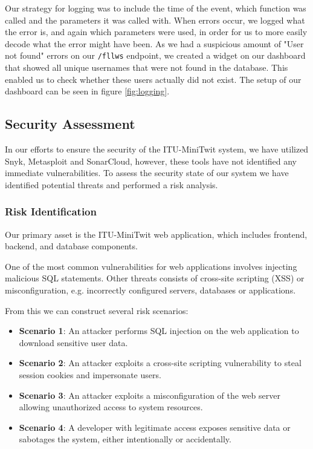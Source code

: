 Our strategy for logging was to include the time of the event, which function was called and the parameters it was called with. 
When errors occur, we logged what the error is, and again which parameters were used, in order for us to more easily decode what the error might have been.
As we had a suspicious amount of "User not found" errors on our \texttt{/fllws} endpoint, we created a widget on our dashboard that showed all unique usernames that were not found in the database. This enabled us to check whether these users actually did not exist.
The setup of our dashboard can be seen in figure \ref{fig:logging}.


\subsection{Security Assessment}
In our efforts to ensure the security of the ITU-MiniTwit system, we have utilized Snyk, Metasploit and SonarCloud, however, these tools have not identified any immediate vulnerabilities. To assess the security state of our system we have identified potential threats and performed a risk analysis.

\subsubsection*{Risk Identification}
Our primary asset is the ITU-MiniTwit web application, which includes frontend, backend, and database components.

One of the most common vulnerabilities for web applications involves injecting malicious SQL statements. Other threats consists of cross-site scripting (XSS) or misconfiguration, e.g. incorrectly configured servers, databases or applications.

From this we can construct several risk scenarios:

\begin{multicols}{2}
    \begin{itemize}
        \item \textbf{Scenario 1}: An attacker performs SQL injection on the web application to download sensitive user data.
        \item \textbf{Scenario 2}: An attacker exploits a cross-site scripting vulnerability to steal session cookies and impersonate users.
        \item \textbf{Scenario 3}: An attacker exploits a misconfiguration of the web server allowing unauthorized access to system resources.
        \item \textbf{Scenario 4}: A developer with legitimate access exposes sensitive data or sabotages the system, either intentionally or accidentally.
    \end{itemize} 
\end{multicols}

